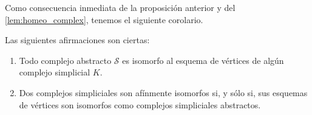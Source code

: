 Como consecuencia inmediata de la proposición anterior y del \autoref{lem:homeo_complex},
tenemos el siguiente corolario.

\begin{corolario}
	Las siguientes afirmaciones son ciertas:
	\begin{enumerate}[label=(\alph{*})]
		\item Todo complejo abstracto \(\mathcal{S}\) es isomorfo al esquema de vértices
			de algún complejo simplicial \(K\).
		\item Dos complejos simpliciales son afínmente isomorfos si, y sólo si, sus esquemas
			de vértices son isomorfos como complejos simpliciales abstractos.
	\end{enumerate}
\end{corolario}

\endinput
